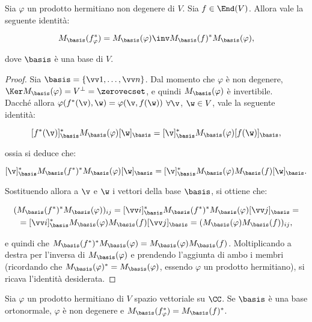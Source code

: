 \begin{proposition}
	Sia $\varphi$ un prodotto hermitiano non degenere di $V$. Sia $f \in \End(V)$. Allora
	vale la seguente identità:
	
	\[ M_\basis(f_\varphi^*) = M_\basis(\varphi)\inv M_\basis(f)^* M_\basis(\varphi), \]
	
	dove $\basis$ è una base di $V$.
\end{proposition}

\begin{proof} Sia $\basis = \{ \vv 1, \ldots, \vv n\}$.
	Dal momento che $\varphi$ è non degenere, $\Ker M_\basis(\varphi) = V^\perp = \zerovecset$, e quindi
	$M_\basis(\varphi)$ è invertibile. \\
	
	Dacché allora $\varphi(f^*(\v), \w) = \varphi(\v, f(\w))$ $\forall \v$, $\w \in V$,
	vale la seguente identità:
	
	\[ [f^*(\v)]_\basis^* M_\basis(\varphi) [\w]_\basis = [\v]_\basis^* M_\basis(\varphi) [f(\w)]_\basis, \]
	
	ossia si deduce che:
	
	\[ [\v]_\basis^* M_\basis(f^*)^* M_\basis(\varphi) [\w]_\basis = [\v]_\basis^* M_\basis(\varphi) M_\basis(f) [\w]_\basis. \]
	
	Sostituendo allora a $\v$ e $\w$ i vettori della base $\basis$, si ottiene che:
	
	\begin{gather*}
		(M_\basis(f^*)^* M_\basis(\varphi))_{ij} = [\vv i]_\basis^* M_\basis(f^*)^* M_\basis(\varphi) [\vv j]_\basis = \\ = [\vv i]_\basis^* M_\basis(\varphi) M_\basis(f) [\vv j]_\basis = (M_\basis(\varphi) M_\basis(f))_{ij},
	\end{gather*}
	
	e quindi che $M_\basis(f^*)^* M_\basis(\varphi) = M_\basis(\varphi) M_\basis(f)$. Moltiplicando
	a destra per l'inversa di $M_\basis(\varphi)$ e prendendo l'aggiunta di ambo i membri (ricordando
	che $M_\basis(\varphi)^* = M_\basis(\varphi)$, essendo $\varphi$ un prodotto hermitiano), si ricava
	l'identità desiderata.
	
\end{proof}

\begin{corollary} Sia $\varphi$ un prodotto hermitiano di $V$ spazio vettoriale su $\CC$.
	Se $\basis$ è una base ortonormale, $\varphi$ è non degenere e $M_\basis(f_\varphi^*) = M_\basis(f)^*$.
\end{corollary}

